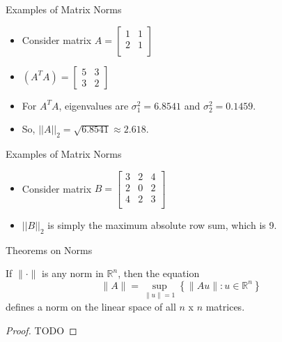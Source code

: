 \documentclass[9pt, serif]{beamer}
\newlength{\wideitemsep}
\let\olditem\item
\renewcommand{\item}{\setlength{\itemsep}{\wideitemsep}\olditem}
\newcommand{\bi}{\begin{itemize}}
\newcommand{\ei}{\end{itemize}}
\newcommand{\norm}[1]{\lVert#1\rVert}
\begin{document}
\begin{frame}{Examples of Matrix Norms}
\bi

\item Consider matrix
$A = \begin{bmatrix}
    1 & 1 \\
    2 & 1\\
\end{bmatrix}$

\pause

\item$(A^TA) = \begin{bmatrix} 5 & 3 \\ 3 & 2 \end{bmatrix}$\pause

\item For $A^TA$, eigenvalues are $\sigma^2_1 = 6.8541$ and $\sigma^2_2 = 0.1459$.
\pause
\item So, $||A||_2 = \sqrt{6.8541} \approx 2.618$.
\ei
\end{frame}

\begin{frame}{Examples of Matrix Norms}
\bi

\item Consider matrix
$B = \begin{bmatrix}
    3 & 2 & 4 \\
    2 & 0 & 2 \\
    4 & 2 & 3 \\
\end{bmatrix}$

\pause

\item $||B||_2$ is simply the maximum absolute row sum, which is 9.

\ei
\end{frame}


\begin{frame}{Theorems on Norms}
    \begin{theorem}
        If $\norm{\cdot}$ is any norm in $\mathbb{R}^n$, then the equation 
        $$\norm{A} = \sup_{\norm{u}=1}\left\{\norm{Au}:u\in\mathbb{R}^n\right\}$$ defines a norm on the linear space of all $n$ x $n$
        matrices.
    \end{theorem} \pause
    \begin{proof}
        TODO
    \end{proof}
\end{frame}
\end{document}
